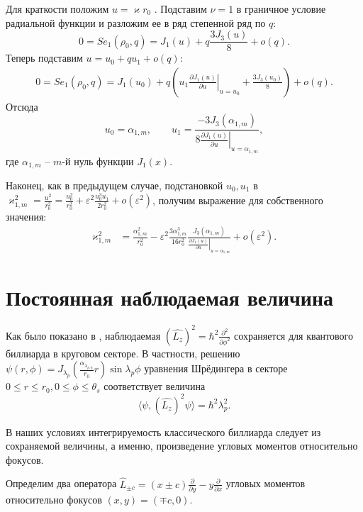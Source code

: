 Для краткости положим $u = \varkappa r_0$ .
Подставим $\nu = 1$ в граничное условие радиальной функции и разложим ее в ряд степенной ряд по $q$:
\begin{equation*}
    0 = Se_1(\rho_0, q) = 
    J_1(u) + q  \frac{3 J_3(u)}{8} + o(q).
\end{equation*}
Теперь подставим $u = u_0 + q u_1 + o(q)$:
\begin{align*}
    0 = Se_1(\rho_0, q) =    J_1(u_0) + q \left( 
    u_1 \left.\frac{\partial J_1 (u)}{\partial u}\right|_{u=u_0}
    + \frac{3 J_3(u_0)}{8}
    \right) + o(q).
\end{align*}
Отсюда 
\begin{equation*}
u_0 = \alpha_{1, m}, \qquad u_1 = 
\frac{ - 3 J_3(\alpha_{1, m}) }{8\left.
\frac{\partial J_1 (u)}{\partial u}\right|_{u=\alpha_{1, m}}},
\end{equation*}
где $\alpha_{1, m}$ -- $m$-й нуль функции $J_1(x)$. 

Наконец, как в предыдущем случае, подстановкой $u_0, u_1$ в $\varkappa_{1, m}^2 = \frac{u^2}{r_0^2} = \frac{u_0^2}{r_0^2} + \varepsilon^2 \frac{u_0^3 u_1}{2r_0^2} + o(\varepsilon^2)$, получим выражение для собственного значения:
\begin{align}
    \varkappa_{1, m}^2& = \frac{\alpha_{1, m}^2}{r_0^2} - \varepsilon^2 \frac{3\alpha_{1, m}^3}{16r_0^2} 
    \frac{J_3(\alpha_{1, m})}{\left.\frac{\partial J_1 (u)}{\partial u}\right|_{u=\alpha_{1, m}}} 
    + o(\varepsilon^2).  \label{eq:valS2}
\end{align}

\section{Постоянная наблюдаемая величина}\label{sec:ch2/sec3}

Как было показано в  \cite{wref13}, наблюдаемая  $(\hat{L_z})^2=\hbar^2\frac{\partial^2}{\partial \phi^2}$ сохраняется для квантового биллиарда в круговом секторе. 
В частности, решению $\psi(r,\phi) = J_{\lambda_p}(\frac{\alpha_{\lambda_{p,n}}}{r_0}r) \sin \lambda_p \phi$ 
уравнения Шрёдингера в секторе $0\leq r \leq r_0, 0 \leq \phi \leq \theta_s$ соответствует величина $$\langle \psi, (\hat{L_z})^2\psi\rangle = \hbar^2 \lambda_p^2.$$

В наших условиях интегрируемость классического биллиарда следует из сохраняемой величины, а именно, произведение угловых моментов относительно фокусов.


Определим два оператора  $\hat L_{\pm c} = (x \pm c)\frac{\partial}{\partial y} - y\frac{\partial}{\partial x}$ угловых моментов относительно фокусов  $(x,y) = (\mp c, 0)$.


